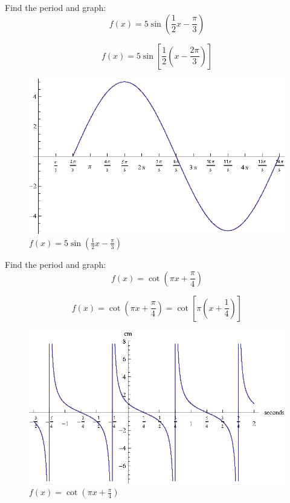 \documentclass[fleqn,addpoints]{exam}
\begin{document}
\begin{questions}
    \question[10]
      Find the period and graph:
      \[
        f(x) = 5 \sin \left( \frac{1}{2} x - \frac{\pi}{3} \right)
      \]

      \begin{solution}
        \[
          f(x) = 5 \sin \left[ \frac{1}{2} \left( x - \frac{2 \pi}{3} \right) \right]
        \]

        \begin{figure}[H]
          \centering
          \includegraphics{graph1.eps}
          \caption{$f(x) = 5 \sin \left( \frac{1}{2} x - \frac{\pi}{3} \right)$}
        \end{figure}

      \end{solution}

    \question[10]
      Find the period and graph:
      \[
        f(x) = \cot \left( \pi x + \frac{\pi}{4} \right)
      \]

      \begin{solution}
        \[
          f(x) = \cot \left( \pi x + \frac{\pi}{4} \right) = \cot \left[ \pi \left( x + \frac{1}{4} \right) \right ]
        \]

        \begin{figure}[H]
          \centering
          \includegraphics{graph2.eps}
          \caption{$f(x) = \cot \left( \pi x + \frac{\pi}{4} \right)$}
        \end{figure}


\end{solution}
\end{questions}
\end{document}
